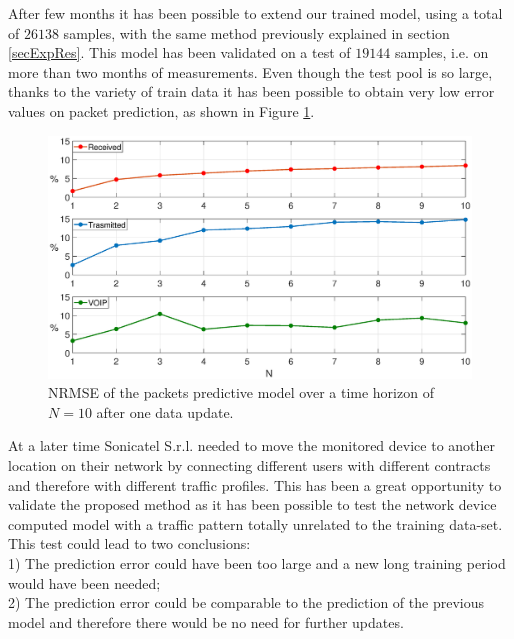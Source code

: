 After few months it has been possible to extend our trained model, using a total of $26138$ samples, with the same method previously explained in section \ref{secExpRes}. This model has been validated on a test of $19144$ samples, i.e. on more than two months of measurements. Even though the test pool is so large, thanks to the variety of train data it has been possible to obtain very low error values on packet prediction, as shown in Figure \ref{fig:{LONGTEST_Pescara}}.
\begin{figure}[H]
	\centering
	\includegraphics[trim={120 0 120 0}, width=1\linewidth]{figure/LONGTEST_PESCARA.eps}
	\caption{NRMSE of the packets predictive model over a time horizon of $N=10$ after one data update.}
	\label{fig:{LONGTEST_Pescara}}
\end{figure}
At a later time Sonicatel S.r.l. needed to move the monitored device to another location on their network by connecting different users with different contracts and therefore with different traffic profiles. This has been a great opportunity to validate the proposed method as it has been possible to test the network device computed model with a traffic pattern totally unrelated to the training data-set. This test could lead to two conclusions:\\
1) The prediction error could have been too large and a new long training period would have been needed;\\
2) The prediction error could be comparable to the prediction of the previous model and therefore there would be no need for further updates.\\
